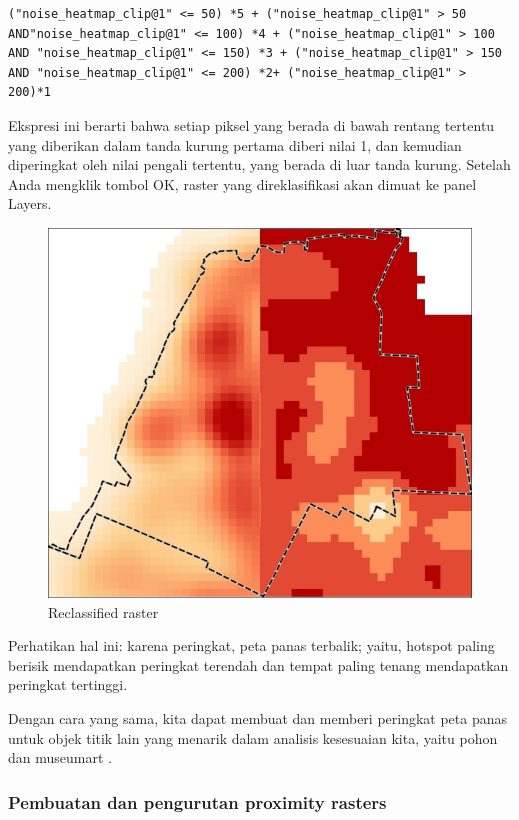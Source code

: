 \documentclass[]{book}
\begin{document}
\begin{verbatim}
("noise_heatmap_clip@1" <= 50) *5 + ("noise_heatmap_clip@1" > 50 AND"noise_heatmap_clip@1" <= 100) *4 + ("noise_heatmap_clip@1" > 100 AND "noise_heatmap_clip@1" <= 150) *3 + ("noise_heatmap_clip@1" > 150 AND "noise_heatmap_clip@1" <= 200) *2+ ("noise_heatmap_clip@1" > 200)*1
\end{verbatim}

Ekspresi ini berarti bahwa setiap piksel yang berada di bawah rentang tertentu yang diberikan dalam tanda kurung pertama diberi nilai 1, dan kemudian diperingkat oleh nilai pengali tertentu, yang berada di luar tanda kurung. Setelah Anda mengklik tombol OK, raster yang direklasifikasi akan dimuat ke panel Layers.

\begin{figure}

{\centering \includegraphics[width=0.7\linewidth]{images/04/fig37} 

}

\caption{Reclassified raster}\label{fig:fig1437}
\end{figure}

Perhatikan hal ini: karena peringkat, peta panas terbalik; yaitu, hotspot paling berisik mendapatkan peringkat terendah dan tempat paling tenang mendapatkan peringkat tertinggi.

Dengan cara yang sama, kita dapat membuat dan memberi peringkat peta panas untuk objek titik lain yang menarik dalam analisis kesesuaian kita, yaitu pohon dan museumart .

\hypertarget{pembuatan-dan-pengurutan-proximity-rasters}{%
\subsubsection{Pembuatan dan pengurutan proximity rasters}\label{pembuatan-dan-pengurutan-proximity-rasters}}
\end{document}
